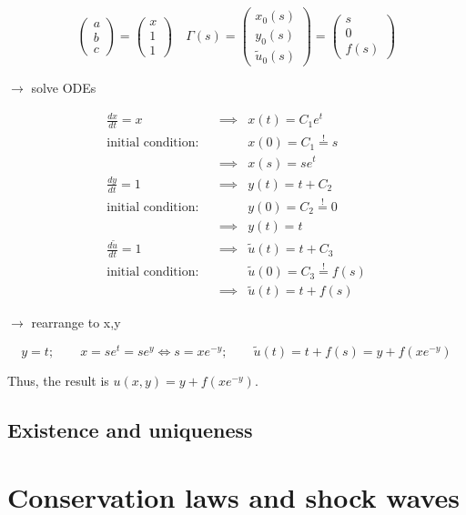 $$
\begin{pmatrix}
a\\b\\c
\end{pmatrix} = \begin{pmatrix}
x\\1\\1
\end{pmatrix} \quad \varGamma(s) = \begin{pmatrix}
x_{0}(s)\\y_{0}(s) \\\tilde{u}_{0}(s)
\end{pmatrix} = \begin{pmatrix}
s\\0\\f(s)
\end{pmatrix}
$$

$\to$ solve ODEs

\begin{align*}
 \frac{dx}{dt} = x & &  \implies & x(t) = C_{1}e^t \\
 \text{initial condition:}  & &  & x(0) = C_{1} \stackrel{!}{=} s \\
 &  & \implies & x(s) = se^t \\
\frac{dy}{dt} = 1 &  & \implies  & y(t) = t+C_{2} \\
\text{initial condition:}  &  &  & y(0) = C_{2} \stackrel{!}{=} 0 \\
 &  & \implies & y(t) = t \\
\frac{d\tilde{u}}{dt} = 1 &  & \implies & \tilde{u}(t) = t+C_{3} \\
\text{initial condition:} &  &  & \tilde{u}(0) = C_{3} \stackrel{!}{=} f(s) \\
 &  & \implies & \tilde{u}(t) = t + f(s)
\end{align*}

$\to$ rearrange to x,y

$$
y=t;\quad\quad x=se^t = se^y \iff s=xe^{-y};\quad\quad \tilde{u}(t) = t+f(s) = y + f(xe^{-y})
$$

Thus, the result is $u(x,y) = y + f(xe^{-y})$.

\subsection{Existence and uniqueness}

\section{Conservation laws and shock waves}

